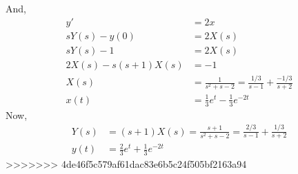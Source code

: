 \documentclass[11pt]{beamer}
\theoremstyle{plain}
\begin{document}
\begin{frame}
    And,
    \begin{align*}
        y'&=2x\\
        sY(s)-y(0)&=2X(s)\\
        sY(s)-1&=2X(s)\\
        2X(s)-s(s+1)X(s)&=-1\\
        X(s)&=\frac{1}{s^2+s-2}=\frac{1/3}{s-1}+\frac{-1/3}{s+2}\\
        x(t)&=\frac{1}{3}e^{t}-\frac{1}{3}e^{-2t}
    \end{align*}
    Now,
    \begin{align*}
        Y(s)&=(s+1)X(s)=\frac{s+1}{s^2+s-2}=\frac{2/3}{s-1}+\frac{1/3}{s+2}\\
        y(t)&=\frac{2}{3}e^{t}+\frac{1}{3}e^{-2t}
    \end{align*}
>>>>>>> 4de46f5c579af61dac83e6b5c24f505bf2163a94
\end{frame}
\end{document}
